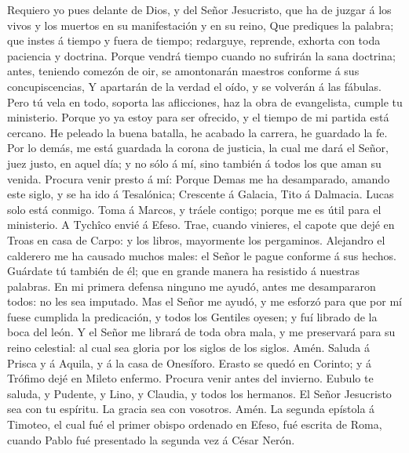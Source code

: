  Requiero yo pues delante de Dios, y del Señor Jesucristo,
que ha de juzgar á los vivos y los muertos en su manifestación y en su
reino,  Que prediques la palabra; que instes á tiempo y
fuera de tiempo; redarguye, reprende, exhorta con toda paciencia y
doctrina.  Porque vendrá tiempo cuando no sufrirán la sana
doctrina; antes, teniendo comezón de oir, se amontonarán maestros
conforme á sus concupiscencias,  Y apartarán de la verdad el
oído, y se volverán á las fábulas.  Pero tú vela en todo,
soporta las aflicciones, haz la obra de evangelista, cumple tu
ministerio.  Porque yo ya estoy para ser ofrecido, y el
tiempo de mi partida está cercano.  He peleado la buena
batalla, he acabado la carrera, he guardado la fe.  Por lo
demás, me está guardada la corona de justicia, la cual me dará el Señor,
juez justo, en aquel día; y no sólo á mí, sino también á todos los que
aman su venida.  Procura venir presto á mí: 
Porque Demas me ha desamparado, amando este siglo, y se ha ido á
Tesalónica; Crescente á Galacia, Tito á Dalmacia.  Lucas
solo está conmigo. Toma á Marcos, y tráele contigo; porque me es útil
para el ministerio.  A Tychîco envié á Efeso. 
Trae, cuando vinieres, el capote que dejé en Troas en casa de Carpo: y
los libros, mayormente los pergaminos.  Alejandro el
calderero me ha causado muchos males: el Señor le pague conforme á sus
hechos.  Guárdate tú también de él; que en grande manera ha
resistido á nuestras palabras.  En mi primera defensa
ninguno me ayudó, antes me desampararon todos: no les sea imputado.
 Mas el Señor me ayudó, y me esforzó para que por mí fuese
cumplida la predicación, y todos los Gentiles oyesen; y fuí librado de
la boca del león.  Y el Señor me librará de toda obra mala,
y me preservará para su reino celestial: al cual sea gloria por los
siglos de los siglos. Amén.  Saluda á Prisca y á Aquila, y
á la casa de Onesíforo.  Erasto se quedó en Corinto; y á
Trófimo dejé en Mileto enfermo.  Procura venir antes del
invierno. Eubulo te saluda, y Pudente, y Lino, y Claudia, y todos los
hermanos.  El Señor Jesucristo sea con tu espíritu. La
gracia sea con vosotros. Amén. La segunda epístola á Timoteo, el cual
fué el primer obispo ordenado en Efeso, fué escrita de Roma, cuando
Pablo fué presentado la segunda vez á César Nerón.
